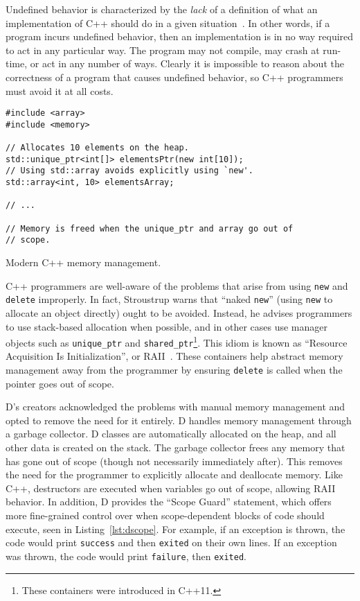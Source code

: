 \documentclass[finalcopy]{srpaper}
\begin{document}
Undefined behavior is
characterized by the \textit{lack} of a definition of what an implementation of
C++ should do in a given situation~\cite{iso/iec}. In other words, if a program
incurs undefined behavior, then an implementation is in no way required to act
in any particular way. The program may not compile, may crash at run-time, or
act in any number of ways. Clearly it is impossible to reason about the
correctness of a program that causes undefined behavior, so C++ programmers
must avoid it at all costs.

\begin{listing}
\begin{verbatim}
#include <array>
#include <memory>

// Allocates 10 elements on the heap.
std::unique_ptr<int[]> elementsPtr(new int[10]);
// Using std::array avoids explicitly using `new'.
std::array<int, 10> elementsArray;

// ...

// Memory is freed when the unique_ptr and array go out of
// scope.
\end{verbatim}
\label{lst:cppmodernmemory}
\caption{Modern C++ memory management.}
\end{listing}

C++ programmers are well-aware of the problems that arise from using
\texttt{new} and \texttt{delete} improperly. In fact, Stroustrup warns that
``naked \texttt{new}'' (using \texttt{new} to allocate an object directly)
ought to be avoided. Instead, he advises programmers to use stack-based
allocation when possible, and in other cases use manager objects such as
\texttt{unique\_ptr} and \texttt{shared\_ptr}\footnote{These containers were
    introduced in C++11.}. This idiom is known as ``Resource Acquisition Is
Initialization'', or RAII~\cite{stroustrup2013the}. These containers help
abstract memory management away from the programmer by ensuring \texttt{delete}
is called when the pointer goes out of scope.

D's creators acknowledged the problems with manual memory management and opted
to remove the need for it entirely. D handles memory management through a
garbage collector. D classes are automatically allocated on the heap, and all
other data is created on the stack. The garbage collector frees any memory that
has gone out of scope (though not necessarily immediately after). This removes
the need for the programmer to explicitly allocate and deallocate memory. Like
C++, destructors are executed when variables go out of scope, allowing RAII
behavior. In addition, D provides the ``Scope Guard'' statement, which offers
more fine-grained control over when scope-dependent blocks of code should
execute, seen in Listing~\ref{lst:dscope}. For example, if an exception is
thrown, the code would print \texttt{success} and then \texttt{exited} on their
own lines. If an exception was thrown, the code would print \texttt{failure},
then \texttt{exited}.
\end{document}
